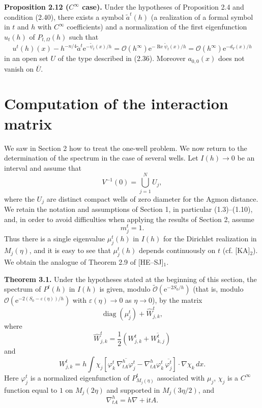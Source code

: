 \documentclass[11pt]{article}
\newcommand{\Ree}{\operatorname{Re}}
\newcommand{\diag}{\operatorname{diag}}
\newcommand{\Ot}{\widetilde{\mathcal O}}
\newcommand{\OO}{\mathcal O}
\newcommand{\dd}{\,d}
\newcommand{\ii}{\mathrm{i}}
\newcommand{\e}{\mathrm{e}}
\begin{document}
\medskip
\noindent\textbf{Proposition 2.12 ($C^\infty$ case).}
Under the hypotheses of Proposition 2.4 and condition (2.40), there exists a symbol $\widetilde a^t(h)$ (a realization of a formal symbol in $t$ and $h$ with $C^\infty$ coefficients) and a normalization of the first eigenfunction $u_t(h)$ of $P_{t,\Omega}(h)$ such that
\[
u^t(h)(x)-h^{-n/4}\widetilde a^t\e^{-\widetilde\psi_t(x)/h}
=\OO(h^\infty)\e^{-\Ree\widetilde\psi_t(x)/h}
=\OO(h^\infty)\e^{-d_V(x)/h}
\]
in an open set $U$ of the type described in (2.36). Moreover $a_{0,0}(x)$ does not vanish on $\overline U$.

\section{Computation of the interaction matrix}

We saw in Section 2 how to treat the one-well problem. We now return to the determination of the spectrum in the case of several wells.
Let $I(h)\to0$ be an interval and assume that
\[
V^{-1}(0)=\bigcup_{j=1}^N U_j,
\]
where the $U_j$ are distinct compact wells of zero diameter for the Agmon distance. We retain the notation and assumptions of Section 1, in particular (1.3)--(1.10), and, in order to avoid difficulties when applying the results of Section 2, assume
\begin{equation}
m_j^t=1.
\tag{3.1}
\end{equation}
Thus there is a single eigenvalue $\mu_j^t(h)$ in $I(h)$ for the Dirichlet realization in $M_j(\eta)$, and it is easy to see that $\mu_j^t(h)$ depends continuously on $t$ (cf. [KA]$_2$). We obtain the analogue of Theorem 2.9 of [HE--SJ]$_1$.

\medskip
\noindent\textbf{Theorem 3.1.}
Under the hypotheses stated at the beginning of this section, the spectrum of $P^t(h)$ in $I(h)$ is given, modulo $\Ot(\e^{-2S_0/h})$ (that is, modulo $\OO(\e^{-2(S_0-\varepsilon(\eta))/h})$ with $\varepsilon(\eta)\to0$ as $\eta\to0$), by the matrix
\begin{equation}
\diag(\mu_j^t)+\widehat W_{j,k}^t,
\tag{3.2}
\end{equation}
where
\[
\widehat W_{j,k}^t=\frac12\left(W_{j,k}^t+\overline{W_{k,j}^t}\right)
\]
and
\begin{equation}
W_{j,k}^t
=h\int \chi_j\left[
\varphi_k^t\,\overline{\nabla_{tA}^h\varphi_j^t}
-\nabla_{tA}^h\varphi_k^t\,\overline{\varphi_j^t}
\right]\cdot\nabla\chi_k\dd x.
\tag{3.3}
\end{equation}
Here $\varphi_j^t$ is a normalized eigenfunction of $P_{M_j(\eta)}^t$ associated with $\mu_j$, $\chi_j$ is a $C^\infty$ function equal to $1$ on $M_j(2\eta)$ and supported in $M_j(3\eta/2)$, and
\[
\nabla_{tA}^h=h\nabla+\ii tA.
\]
\end{document}
